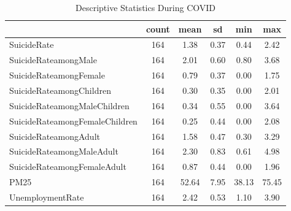 \begin{table}[htbp]\centering
\def\sym#1{\ifmmode^{#1}\else\(^{#1}\)\fi}
\caption{Descriptive Statistics During COVID}
\begin{tabular}{l*{1}{ccccc}}
\hline\hline
            &       count&        mean&          sd&         min&         max\\
\hline
SuicideRate &         164&        1.38&        0.37&        0.44&        2.42\\
SuicideRateamongMale&         164&        2.01&        0.60&        0.80&        3.68\\
SuicideRateamongFemale&         164&        0.79&        0.37&        0.00&        1.75\\
SuicideRateamongChildren&         164&        0.30&        0.35&        0.00&        2.01\\
SuicideRateamongMaleChildren&         164&        0.34&        0.55&        0.00&        3.64\\
SuicideRateamongFemaleChildren&         164&        0.25&        0.44&        0.00&        2.08\\
SuicideRateamongAdult&         164&        1.58&        0.47&        0.30&        3.29\\
SuicideRateamongMaleAdult&         164&        2.30&        0.83&        0.61&        4.98\\
SuicideRateamongFemaleAdult&         164&        0.87&        0.44&        0.00&        1.96\\
PM25        &         164&       52.64&        7.95&       38.13&       75.45\\
UnemploymentRate&         164&        2.42&        0.53&        1.10&        3.90\\
\hline\hline
\end{tabular}
\end{table}
